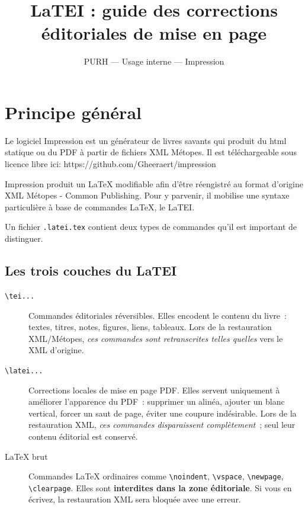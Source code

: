 \documentclass[11pt,a4paper]{article}
\title{%
	\textbf{LaTEI : guide des corrections éditoriales de mise en page}\\[0.4em]
}
\author{PURH — Usage interne — Impression}
\date{}
\newcommand{\cmd}[1]{\texttt{\textbackslash #1}}
\begin{document}
	
	\maketitle
	\tableofcontents
	\newpage
	
	\section{Principe général}
	
	Le logiciel Impression est un générateur de livres savants qui produit du html statique ou du PDF à partir de fichiers XML Métopes. Il est téléchargeable sous licence libre ici: https://github.com/Gheeraert/impression
	
	Impression produit un LaTeX modifiable afin d'être réengistré au format d'origine XML Métopes - Common Publishing. Pour y parvenir, il mobilise une syntaxe particulière à base de commandes LaTeX, le LaTEI.
	
	Un fichier \texttt{.latei.tex} contient deux types de commandes qu'il est
	important de distinguer.
	
	\subsection{Les trois couches du LaTEI}
	
	\begin{description}
		\item[\cmd{tei...}] Commandes éditoriales réversibles. Elles encodent le
		contenu du livre~: textes, titres, notes, figures, liens, tableaux.
		Lors de la restauration XML/Métopes, \emph{ces commandes sont
			retranscrites telles quelles} vers le XML d'origine.
		
		\item[\cmd{latei...}] Corrections locales de mise en page PDF. Elles
		servent uniquement à améliorer l'apparence du PDF~: supprimer un
		alinéa, ajouter un blanc vertical, forcer un saut de page, éviter
		une coupure indésirable. Lors de la restauration XML, \emph{ces
			commandes disparaissent complètement}~; seul leur contenu éditorial
		est conservé.
		
		\item[LaTeX brut] Commandes LaTeX ordinaires comme \cmd{noindent},
		\cmd{vspace}, \cmd{newpage}, \cmd{clearpage}. Elles sont
		\textbf{interdites dans la zone éditoriale}. Si vous en écrivez,
		la restauration XML sera bloquée avec une erreur.
	\end{description}
	
\end{document}
